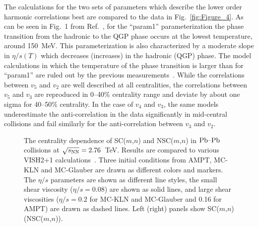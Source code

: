 The calculations for the two sets of parameters which describe the lower order harmonic correlations best are compared to the data in Fig.~\ref{fig:Figure_4}. 
As can be seen in Fig.~1 from Ref.~\cite{Niemi:2015qia}, for the ``param1'' parameterization the phase transition from the hadronic to the QGP phase occurs at the lowest temperature, around 150~MeV. This parameterization is also characterized by a moderate slope in $\eta/s(T)$ which decreases (increases) in the hadronic (QGP) phase.
The model calculations in which the temperature of the phase transition is larger than for ``param1'' are ruled out by the previous measurements~\cite{ALICE:2016kpq}.
While the correlations between $v_5$ and $v_2$ are well described at all centralities, the correlations between $v_5$ and $v_3$ are reproduced in 0--40\% centrality range and deviate by about one sigma for 40--50\% centrality.
In the case of $v_4$ and $v_3$, the same models underestimate the anti-correlation in the data significantly in mid-central collisions and fail similarly for the anti-correlation between $v_3$ and $v_2$.

\begin{figure}[t!]
	\begin{center}
        \caption{The centrality dependence of SC($m$,$n$) and NSC($m$,$n$) in $\textnormal{Pb--Pb}$ collisions at $\sqrt{s_{\textnormal{NN}}}=2.76$~TeV. Results are compared to various VISH2+1 calculations~\cite{Zhu:2016puf}. Three initial conditions from AMPT, MC-KLN and MC-Glauber are drawn as different colors and markers. The $\eta/s$ parameters are shown as different line styles, the small shear viscosity ($\eta/s=0.08$) are shown as solid lines, and large shear viscosities ($\eta/s=0.2$ for MC-KLN and MC-Glauber and 0.16 for AMPT) are drawn as dashed lines. Left (right) panels show SC($m$,$n$)  (NSC($m$,$n$)).}
        \label{fig:Figure_5}
        \end{center}   
 \end{figure}
 

